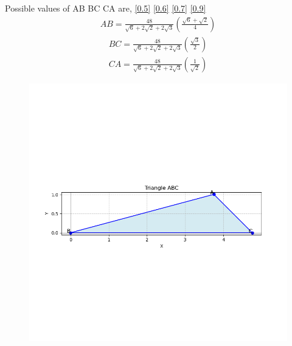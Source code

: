 \documentclass[journal]{IEEEtran}
\begin{document}
Possible values of AB BC CA are, \ref{0.5} \ref{0.6} \ref{0.7} \ref{0.9}
\begin{align}
    AB = \frac{48}{\sqrt{6}+2\sqrt{2}+2\sqrt{3}}(\frac{\sqrt{6}+\sqrt{2}}{4})
\end{align}
\begin{align}
    BC = \frac{48}{\sqrt{6}+2\sqrt{2}+2\sqrt{3}}(\frac{\sqrt{3}}{2})
\end{align}
\begin{align}
    CA = \frac{48}{\sqrt{6}+2\sqrt{2}+2\sqrt{3}}(\frac{1}{\sqrt{2}})
\end{align}
\begin{figure}[h!]
   \centering
   \includegraphics[width=\linewidth]{figs/Figure_1.png}
   \caption{}
   \label{stemplot}
\end{figure}
\end{document}
